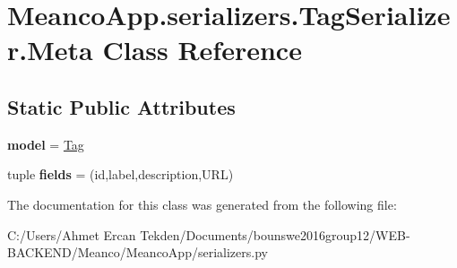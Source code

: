 \hypertarget{class_meanco_app_1_1serializers_1_1_tag_serializer_1_1_meta}{}\section{Meanco\+App.\+serializers.\+Tag\+Serializer.\+Meta Class Reference}
\label{class_meanco_app_1_1serializers_1_1_tag_serializer_1_1_meta}
\subsection*{Static Public Attributes}
\begin{DoxyCompactItemize}
\item 
\hypertarget{class_meanco_app_1_1serializers_1_1_tag_serializer_1_1_meta_a738f8b082e5e86c8e217b3a4ba55a3e5}{}\label{class_meanco_app_1_1serializers_1_1_tag_serializer_1_1_meta_a738f8b082e5e86c8e217b3a4ba55a3e5} 
{\bfseries model} = \hyperlink{class_meanco_app_1_1models_1_1tag_1_1_tag}{Tag}
\item 
\hypertarget{class_meanco_app_1_1serializers_1_1_tag_serializer_1_1_meta_a707f5616e1f6153ebf245092e54cdcda}{}\label{class_meanco_app_1_1serializers_1_1_tag_serializer_1_1_meta_a707f5616e1f6153ebf245092e54cdcda} 
tuple {\bfseries fields} = (\textquotesingle{}id\textquotesingle{},\textquotesingle{}label\textquotesingle{},\textquotesingle{}description\textquotesingle{},\textquotesingle{}U\+RL\textquotesingle{})
\end{DoxyCompactItemize}


The documentation for this class was generated from the following file\+:\begin{DoxyCompactItemize}
\item 
C\+:/\+Users/\+Ahmet Ercan Tekden/\+Documents/bounswe2016group12/\+W\+E\+B-\/\+B\+A\+C\+K\+E\+N\+D/\+Meanco/\+Meanco\+App/serializers.\+py\end{DoxyCompactItemize}
